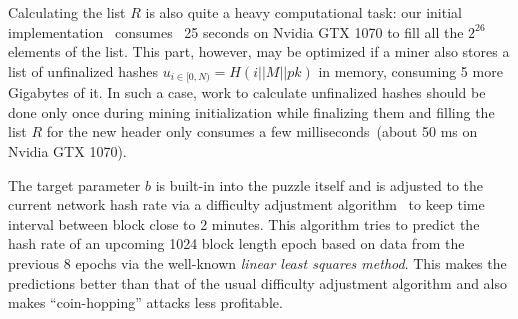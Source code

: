 Calculating the list $R$ is also quite a heavy computational task: our initial implementation~\cite{ergoMiner}
consumes ~25 seconds on Nvidia GTX 1070 to fill all the $2^{26}$ elements of the list.
This part, however, may be optimized if a miner also stores a list of unfinalized hashes $u_{i \in [0,N)}=H(i||M||pk)$
in memory, consuming 5 more Gigabytes of it. In such a case, work to calculate unfinalized hashes should
be done only once during mining initialization while finalizing them and filling the list $R$
for the new header only consumes a few milliseconds~(about 50 ms on Nvidia GTX 1070).

The target parameter $b$ is built-in into the puzzle itself
and is adjusted to the current network hash rate via a difficulty adjustment
algorithm~\cite{meshkov2017short} to keep time interval between block close to 2 minutes.
This algorithm tries to predict the hash rate of an upcoming 1024 block length epoch
based on data from the previous 8 epochs via the well-known {\em linear least squares method}. This makes the predictions better than that of the usual difficulty adjustment algorithm and also makes ``coin-hopping'' attacks less profitable. 
